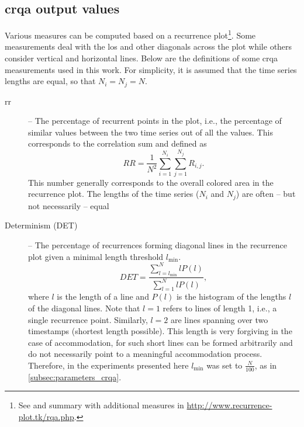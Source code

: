 \subsection{\Acs{crqa} output values}
\label{subsec:output_values}

Various measures can be computed based on a recurrence plot\footnote{See \citet{Marwan2007recurrence} and summary with additional measures in \url{http://www.recurrence-plot.tk/rqa.php}.}.
Some measurements deal with the \ac{los} and other diagonals across the plot while others consider vertical and horizontal lines.
Below are the definitions of some \ac{crqa} measurements used in this work.
For simplicity, it is assumed that the time series lengths are equal, so that $N_i=N_j=N$.

\begin{description}
	\item[\Acf{rr}] -- The percentage of recurrent points in the plot, i.e., the percentage of similar values between the two time series out of all the values.
	This corresponds to the correlation sum and defined as
	\begin{equation}
		\label{eq:rr}
		RR = \frac{1}{N^2} \sum_{i=1}^{N_i} \sum_{j=1}^{N_j} R_{i,j}.
	\end{equation}
	This number generally corresponds to the overall colored area in the recurrence plot.
	The lengths of the time series ($N_i$ and $N_j$) are often -- but not necessarily -- equal
	
	\item[Determinism (DET)] -- The percentage of recurrences forming diagonal lines in the recurrence plot given a minimal length threshold $l_{\min}$.
	\begin{equation}
		\label{eq:det}
		DET = \frac{\sum_{l=l_{\min}}^{N} l P(l)}{\sum_{l=1}^N l P(l)},
	\end{equation}
	where $l$ is the length of a line and $P(l)$ is the histogram of the lengths $l$ of the diagonal lines.
	Note that $l=1$ refers to lines of length 1, i.e., a single recurrence point.	
	Similarly, $l=2$ are lines spanning over two timestamps (shortest length possible).
	This length is very forgiving in the case of accommodation, for such short lines can be formed arbitrarily and do not necessarily point to a meaningful accommodation process.
	Therefore, in the experiments presented here $l_{\min}$ was set to $\frac{N}{100}$, as in \cref{subsec:parameters_crqa}.
	

\end{description}
